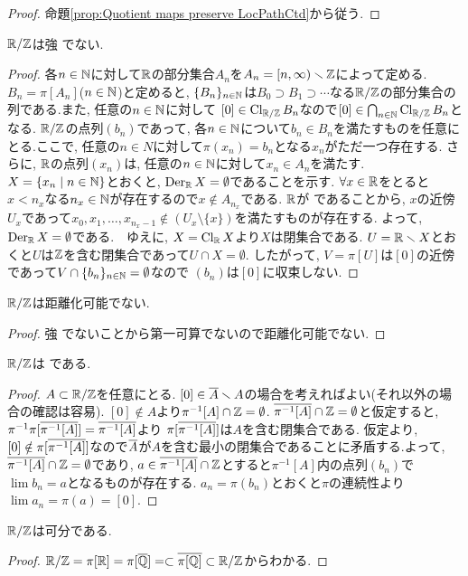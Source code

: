 \documentclass[uplatex, dvipdfmx, a4paper, 12pt, class=jsbook, crop=false]{standalone}
\begin{document}
\begin{proof}
	命題\ref{prop:Quotient maps preserve LocPathCtd}から従う.
\end{proof}
	


\begin{property}
	$\mathbb{R} / \mathbb{Z}$は強 \Frechet でない.
\end{property}
\begin{proof}
	各$n\in \mathbb{N}$に対して$\mathbb{R}$の部分集合$A_n$を$A_n=[n,\infty) \smallsetminus \mathbb{Z}$によって定める. $B_n=\pi[A_n]$($n\in \mathbb{N}$)と定めると, $\{B_n\}_{n\in\mathbb{N}}$は$B_0\supset 
	B_1\supset \cdots$なる$\mathbb{R} / \mathbb{Z}$の部分集合の列である.また, 任意の$n\in\mathbb{N}$に対して
	$[0]\in \mathop{\mathrm{Cl}}\nolimits_{\mathbb{R}/\mathbb{Z}}B_n$なので$[0]\in \bigcap_{n\in\mathbb{N}}\mathop{\mathrm{Cl}}\nolimits_{\mathbb{R}/\mathbb{Z}}B_n$となる. $\mathbb{R}/\mathbb{Z}$の点列$(b_n)$であって, 各$n\in \mathbb{N}$について$b_n\in B_n$を満たすものを任意にとる.ここで, 任意の$n\in N$に対して$\pi(x_n)=b_n$となる$x_n$がただ一つ存在する.
	さらに, $\mathbb{R}$の点列$(x_n)$は, 任意の$n\in \mathbb{N}$に対して$x_n\in A_n$を満たす. $X=\setcomp{x_n}{n\in\N}$とおくと, $\mathop{\mathrm{Der}}\nolimits_{\mathbb{R}}X=\emptyset$であることを示す.
	$\forall x\in \mathbb{R}$をとると$x<n_x$なる$n_x\in \mathbb{N}$が存在するので$x\notin A_{n_x}$である. $\mathbb{R}$が であることから, $x$の近傍$U_x$であって$x_0,x_1,\ldots ,
	x_{n_x-1}\notin (U_x\setminus\{x\})$を満たすものが存在する. よって, $\mathop{\mathrm{Der}}\nolimits_{\mathbb{R}}X=\emptyset$である.　ゆえに, $X=\mathop{\mathrm{Cl}}\nolimits_{\mathbb{R}}X$より$X$は閉集合である.
	$U=\mathbb{R}\smallsetminus X$とおくと$U$は$\mathbb{Z}$を含む閉集合であって$U\cap X=\emptyset$. したがって, $V=\pi[U]$は$[0]$の近傍であって$V\cap \{b_n\}_{n\in\mathbb{N}}=\emptyset$なので
	$(b_n)$は$[0]$に収束しない.
\end{proof}

\begin{property}
	$\mathbb{R} / \mathbb{Z}$は距離化可能でない.
\end{property}
\begin{proof}
	強 \Frechet でないことから第一可算でないので距離化可能でない.
\end{proof}

\begin{property}
	$\mathbb{R} / \mathbb{Z}$は \Frechet である.
\end{property}

\begin{proof}
	$ A \subset \mathbb{R} / \mathbb{Z} $を任意にとる. $ [0] \in \overline{A} \smallsetminus A$の場合を考えればよい(それ以外の場合の確認は容易). $ [0] \notin A $より$\pi^{-1}[A] \cap \mathbb{Z} = \emptyset $. $\overline{\pi^{-1}[A]} \cap \mathbb{Z} =\emptyset $と仮定すると, $\pi^{-1}\pi[\overline{\pi^{-1}[A]}] = \overline{\pi^{-1}[A]} $より
	$ \pi[\overline{\pi^{-1}[A]}]$は$A$を含む閉集合である. 仮定より, $ [0] \notin \pi[\overline{\pi^{-1}[A]}]$なので$ \overline{A}$が$A$を含む最小の閉集合であることに矛盾する.よって, $\overline{\pi^{-1}[A]} \cap \mathbb{Z} = \emptyset $であり, $a\in \overline{\pi^{-1}[A]} \cap \mathbb{Z} $とすると$ \pi^{-1}[A] $内の点列$ (b_n) $で
	$\lim b_n=a$となるものが存在する. $ a_n = \pi(b_n) $とおくと$ \pi $の連続性より$ \lim a_n = \pi(a) = [0] $.
	\end{proof}

\begin{property}
	$\mathbb{R} / \mathbb{Z}$は可分である.
\end{property}

\begin{proof}
	$ \mathbb{R} / \mathbb{Z} = \pi[\mathbb{R}] = \pi[\overline{\mathbb{Q}}] = \subset \overline{\pi[\mathbb{Q}]} \subset \mathbb{R} / \mathbb{Z}$からわかる.
\end{proof}
\end{document}
